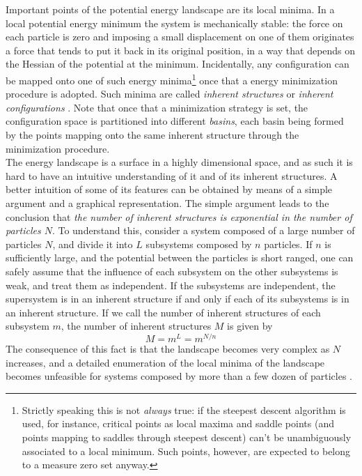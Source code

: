 Important points of the potential energy landscape are its local minima. In a local potential energy minimum the system is mechanically stable: the force on each particle is zero and imposing a small displacement on one of them originates a force that tends to put it back in its original position, in a way that depends on the Hessian of the potential at the minimum. Incidentally, any configuration can be mapped onto one of such energy minima\footnote{Strictly speaking this is not \emph{always} true: if the steepest descent algorithm is used, for instance, critical points as local maxima and saddle points (and points mapping to saddles through steepest descent) can't be unambiguously associated to a local minimum. Such points, however, are expected to belong to a measure zero set anyway.} once that a energy minimization procedure is adopted. Such minima are called \emph{inherent structures} or \emph{inherent configurations} \cite{stillinger1995topographic}. Note that once that a minimization strategy is set, the configuration space is partitioned into different \emph{basins}, each basin being formed by the points mapping onto the same inherent structure through the minimization procedure.\\
The energy landscape is a surface in a highly dimensional space, and as such it is hard to have an intuitive understanding of it and of its inherent structures. A better intuition of some of its features can be obtained by means of a simple argument and a graphical representation.
The simple argument leads to the conclusion that \emph{the number of inherent structures is exponential in the number of particles $N$}. To understand this, consider a system composed of a large number of particles $N$, and divide it into $L$ subsystems composed by $n$ particles. If $n$ is sufficiently large, and the potential between the particles is short ranged, one can safely assume that the influence of each subsystem on the other subsystems is weak, and treat them as independent. If the subsystems are independent, the supersystem is in an inherent structure if and only if each of its subsystems is in an inherent structure. If we call the number of inherent structures of each subsystem $m$, the number of inherent structures $M$ is given by 
\begin{equation}
	M = m^{L} = m^{N/n}
\end{equation}
The consequence of this fact is that the landscape becomes very complex as $N$ increases, and a detailed enumeration of the local minima of the landscape becomes unfeasible for systems composed by more than a few dozen of particles \cite{doye1999evolution}. \\
